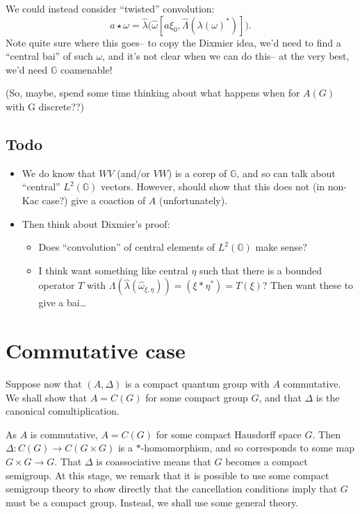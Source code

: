 \documentclass[twoside,a4paper,12pt]{article}
\theoremstyle{plain}
\theoremstyle{definition}
\newcommand{\G}{{\mathbb G}}
\begin{document}
We could instead consider ``twisted'' convolution:
\[ a \star \omega = \hat\lambda\big( \hat\omega[ a\xi_0,
\hat\Lambda(\lambda(\omega)^*) ] ). \]
Note quite sure where this goes-- to copy the Dixmier idea, we'd need
to find a ``central bai'' of such $\omega$, and it's not clear when we
can do this-- at the very best, we'd need $\G$ coamenable!

(So, maybe, spend some time thinking about what happens when for $A(G)$
with G discrete??)


\subsection{Todo}

\begin{itemize}
\item We do know that $WV$ (and/or $VW$) is a corep of $\G$, and so can talk
about ``central'' $L^2(\G)$ vectors.  However, should show that this does not
(in non-Kac case?) give a coaction of $A$ (unfortunately).
\item Then think about Dixmier's proof:
\begin{itemize}
\item Does ``convolution'' of central elements of $L^2(\G)$ make sense?
\item I think want something like
central $\eta$ such that there is a bounded operator $T$ with
$\Lambda(\hat\lambda(\hat\omega_{\xi,\eta})) = (\xi*\eta^*) = T(\xi)$?
Then want these to give a bai\ldots
\end{itemize}
\end{itemize}


\section{Commutative case}

Suppose now that $(A,\Delta)$ is a compact quantum group with $A$ commutative.
We shall show that $A=C(G)$ for some compact group $G$, and that $\Delta$ is the
canonical comultiplication.

As $A$ is commutative, $A=C(G)$ for some compact Hausdorff space $G$.  Then
$\Delta:C(G)\rightarrow C(G\times G)$ is a $*$-homomorphism, and so corresponds
to some map $G\times G\rightarrow G$.  That $\Delta$ is coassociative means that
$G$ becomes a compact semigroup.  At this stage, we remark that it is possible
to use some compact semigroup theory to show directly that the cancellation
conditions imply that $G$ must be a compact group.  Instead, we shall use some
general theory.
\end{document}
